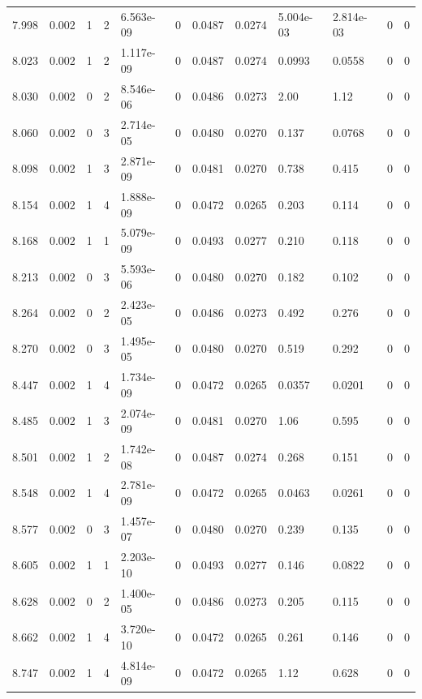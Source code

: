 \documentclass[preview]{standalone}
\begin{document}
{{{{{{\begin{tabular}{L{1.2cm}C{1.2cm} C{0.3cm}C{0.5cm} C{1.4cm}C{1.4cm} C{1.4cm}C{1.4cm} C{1.6cm}C{1.6cm} C{1.6cm}C{1.6cm}}
  7.998  &  0.002  & 1     &  2 &  6.563e-09  & 0  &  0.0487&   0.0274& 5.004e-03 & 2.814e-03   &  0 & 0  \\ 
  8.023  &  0.002  & 1     &  2 &  1.117e-09  & 0  &  0.0487&   0.0274& 0.0993 & 0.0558   &  0 & 0  \\ 
  8.030  &  0.002  & 0     &  2 &  8.546e-06  & 0  &  0.0486&   0.0273& 2.00 & 1.12   &  0 & 0  \\ 
  8.060  &  0.002  & 0     &  3 &  2.714e-05  & 0  &  0.0480&   0.0270& 0.137 & 0.0768   &  0 & 0  \\ 
  8.098  &  0.002  & 1     &  3 &  2.871e-09  & 0  &  0.0481&   0.0270& 0.738 & 0.415   &  0 & 0  \\ 
  8.154  &  0.002  & 1     &  4 &  1.888e-09  & 0  &  0.0472&   0.0265& 0.203 & 0.114   &  0 & 0  \\ 
  8.168  &  0.002  & 1     &  1 &  5.079e-09  & 0  &  0.0493&   0.0277& 0.210 & 0.118   &  0 & 0  \\ 
  8.213  &  0.002  & 0     &  3 &  5.593e-06  & 0  &  0.0480&   0.0270& 0.182 & 0.102   &  0 & 0  \\ 
  8.264  &  0.002  & 0     &  2 &  2.423e-05  & 0  &  0.0486&   0.0273& 0.492 & 0.276   &  0 & 0  \\ 
  8.270  &  0.002  & 0     &  3 &  1.495e-05  & 0  &  0.0480&   0.0270& 0.519 & 0.292   &  0 & 0  \\ 
  8.447  &  0.002  & 1     &  4 &  1.734e-09  & 0  &  0.0472&   0.0265& 0.0357 & 0.0201   &  0 & 0  \\ 
  8.485  &  0.002  & 1     &  3 &  2.074e-09  & 0  &  0.0481&   0.0270& 1.06 & 0.595   &  0 & 0  \\ 
  8.501  &  0.002  & 1     &  2 &  1.742e-08  & 0  &  0.0487&   0.0274& 0.268 & 0.151   &  0 & 0  \\ 
  8.548  &  0.002  & 1     &  4 &  2.781e-09  & 0  &  0.0472&   0.0265& 0.0463 & 0.0261   &  0 & 0  \\ 
  8.577  &  0.002  & 0     &  3 &  1.457e-07  & 0  &  0.0480&   0.0270& 0.239 & 0.135   &  0 & 0  \\ 
  8.605  &  0.002  & 1     &  1 &  2.203e-10  & 0  &  0.0493&   0.0277& 0.146 & 0.0822   &  0 & 0  \\ 
  8.628  &  0.002  & 0     &  2 &  1.400e-05  & 0  &  0.0486&   0.0273& 0.205 & 0.115   &  0 & 0  \\ 
  8.662  &  0.002  & 1     &  4 &  3.720e-10  & 0  &  0.0472&   0.0265& 0.261 & 0.146   &  0 & 0  \\ 
  8.747  &  0.002  & 1     &  4 &  4.814e-09  & 0  &  0.0472&   0.0265& 1.12 & 0.628   &  0 & 0  \\ 

\end{tabular}}}}}}}
\end{document}
